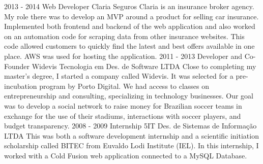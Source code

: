     {}
\cvevent
    {2013 - 2014}
    {Web Developer}
    {Claria Seguros}
    {Claria is an insurance broker agency. My role there was to develop an MVP around a product for selling car insurance. Implemented both frontend and backend of the web application and also worked on an automation code for scraping data from other insurance websites. This code allowed customers to quickly find the latest and best offers available in one place. AWS was used for hosting the application.}
    {}
    {}
    {}
\cvevent
    {2011 - 2013}
    {Developer and Co-Founder}
    {Widevis Tecnologia em Des. de Software LTDA}
    {Close to completing my master's degree, I started a company called Widevis. It was selected for a pre-incubation program by Porto Digital. We had access to classes on entrepreneurship and consulting, specializing in technology businesses. Our goal was to develop a social network to raise money for Brazilian soccer teams in exchange for the use of their stadiums, interactions with soccer players, and budget transparency.}
    {}
    {}
    {}
\cvevent
    {2008 - 2009}
    {Internship}
    {5IT Des. de Sistemas de Informação LTDA}
    {This was both a software development internship and a scientific initiation scholarship called BITEC from Euvaldo Lodi Institute (IEL). In this internship, I worked with a Cold Fusion web application connected to a MySQL Database.}
    {}
    {}
    {}
